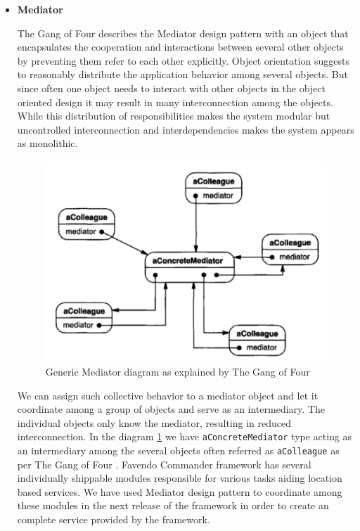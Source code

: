 \begin{itemize}
	\item \textbf{Mediator}
	\par The Gang of Four \cite{gamma1995design} describes the Mediator design pattern with an object that encapsulates the cooperation and interactions between several other objects by preventing them refer to each other explicitly. Object orientation suggests to reasonably distribute the application behavior among several objects. But since often one object needs to interact with other objects in the object oriented design it may result in many interconnection among the objects. While this distribution of responsibilities makes the system modular but uncontrolled interconnection and interdependencies makes the system appears as monolithic.
	\begin{figure}[H]
		\centering
		\includegraphics[scale = 0.5]{images/mediator}
		\caption{Generic Mediator diagram as explained by The Gang of Four  \cite{gamma1995design}}
		\label{figure:design_pattern_mediator}
	\end{figure}
	\par We can assign such collective behavior to a mediator object and let it coordinate among a group of objects and serve as an intermediary. The individual objects only know the mediator, resulting in reduced interconnection. In the diagram \ref{figure:design_pattern_mediator} we have  \texttt{aConcreteMediator} type acting as an intermediary among the several objects often referred as \texttt{aColleague} as per The Gang of Four \cite{gamma1995design}. Favendo Commander framework has several individually shippable modules responsible for various tasks aiding location based services. We have used Mediator design pattern to coordinate among these modules in the next release of the framework in order to create an complete service provided by the framework.

\end{itemize}
